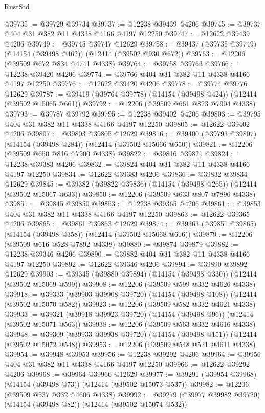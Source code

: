 \begin{lexlean}{RustStd}
\begin{coremodule}
{\begin{coremodule}
{{{{{{{{{{{{{{{{{{{{{{{{{{{{{{{{{{{{{{{{{{{{{{{{{{@39735 := @39729 @39734
@39737 := @12238 @39439 @4206
@39745 := @39737 @404 @31 @382 @11 @4338 @4166 @4197 @12250
@39747 := @12622 @39439 @4206
@39749 := @39745 @39747 @12629
@39758 := @39437 (@39735 @39749) (@14154 (@39498 @462)) (@12414 (@39502 @930 @672))
@39763 := @12206 (@39509 @672 @834 @4741 @4338)
@39764 := @39758 @39763
@39766 := @12238 @39420 @4206
@39774 := @39766 @404 @31 @382 @11 @4338 @4166 @4197 @12250
@39776 := @12622 @39420 @4206
@39778 := @39774 @39776 @12629
@39787 := @39419 (@39764 @39778) (@14154 (@39498 @424)) (@12414 (@39502 @15065 @661))
@39792 := @12206 (@39509 @661 @823 @7904 @4338)
@39793 := @39787 @39792
@39795 := @12238 @39402 @4206
@39803 := @39795 @404 @31 @382 @11 @4338 @4166 @4197 @12250
@39805 := @12622 @39402 @4206
@39807 := @39803 @39805 @12629
@39816 := @39400 (@39793 @39807) (@14154 (@39498 @284)) (@12414 (@39502 @15066 @650))
@39821 := @12206 (@39509 @650 @816 @7900 @4338)
@39822 := @39816 @39821
@39824 := @12238 @39383 @4206
@39832 := @39824 @404 @31 @382 @11 @4338 @4166 @4197 @12250
@39834 := @12622 @39383 @4206
@39836 := @39832 @39834 @12629
@39845 := @39382 (@39822 @39836) (@14154 (@39498 @265)) (@12414 (@39502 @15067 @633))
@39850 := @12206 (@39509 @633 @807 @7896 @4338)
@39851 := @39845 @39850
@39853 := @12238 @39365 @4206
@39861 := @39853 @404 @31 @382 @11 @4338 @4166 @4197 @12250
@39863 := @12622 @39365 @4206
@39865 := @39861 @39863 @12629
@39874 := @39363 (@39851 @39865) (@14154 (@39498 @358)) (@12414 (@39502 @15068 @616))
@39879 := @12206 (@39509 @616 @528 @7892 @4338)
@39880 := @39874 @39879
@39882 := @12238 @39346 @4206
@39890 := @39882 @404 @31 @382 @11 @4338 @4166 @4197 @12250
@39892 := @12622 @39346 @4206
@39894 := @39890 @39892 @12629
@39903 := @39345 (@39880 @39894) (@14154 (@39498 @330)) (@12414 (@39502 @15069 @599))
@39908 := @12206 (@39509 @599 @332 @4626 @4338)
@39918 := @39333 (@39903 @39908 @39720) (@14154 (@39498 @108)) (@12414 (@39502 @15070 @582))
@39923 := @12206 (@39509 @582 @332 @4621 @4338)
@39933 := @39321 (@39918 @39923 @39720) (@14154 (@39498 @96)) (@12414 (@39502 @15071 @563))
@39938 := @12206 (@39509 @563 @332 @4616 @4338)
@39948 := @39309 (@39933 @39938 @39720) (@14154 (@39498 @151)) (@12414 (@39502 @15072 @548))
@39953 := @12206 (@39509 @548 @521 @4611 @4338)
@39954 := @39948 @39953
@39956 := @12238 @39292 @4206
@39964 := @39956 @404 @31 @382 @11 @4338 @4166 @4197 @12250
@39966 := @12622 @39292 @4206
@39968 := @39964 @39966 @12629
@39977 := @39291 (@39954 @39968) (@14154 (@39498 @73)) (@12414 (@39502 @15073 @537))
@39982 := @12206 (@39509 @537 @332 @4606 @4338)
@39992 := @39279 (@39977 @39982 @39720) (@14154 (@39498 @82)) (@12414 (@39502 @15074 @532))
}}}}}}}}}}}}}}}}}}}}}}}}}}}}}}}}}}}}}}}}}}}}}}}}}}
\end{coremodule}}
\end{coremodule}
\end{lexlean}
